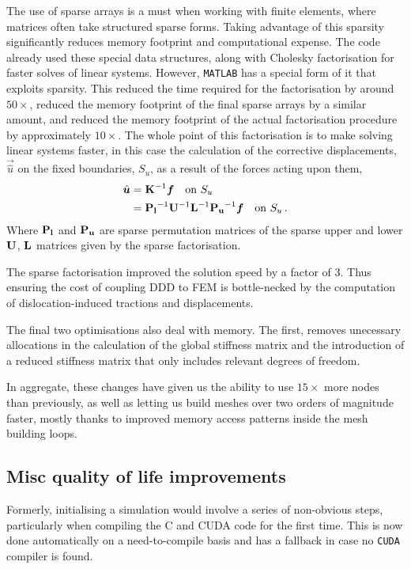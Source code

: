 The use of sparse arrays is a must when working with finite elements, where matrices often take structured sparse forms. Taking advantage of this sparsity significantly reduces memory footprint and computational expense. The code already used these special data structures, along with Cholesky factorisation for faster solves of linear systems. However, \texttt{MATLAB} has a special form of it that exploits sparsity. This reduced the time required for the factorisation by around $50\times$, reduced the memory footprint of the final sparse arrays by a similar amount, and reduced the memory footprint of the actual factorisation procedure by approximately $10 \times$. The whole point of this factorisation is to make solving linear systems faster, in this case the calculation of the corrective displacements, $\vec{\hat{u}}$ on the fixed boundaries, $S_u$, as a result of the forces acting upon them,
\begin{align}
    \vec{\hat{u}} & = \mtx{K}^{-1} \vec{f}\quad \text{on } S_u                                               \\
                  & = \mtx{P_l}^{-1} \mtx{U}^{-1} \mtx{L}^{-1} \mtx{P_u}^{-1} \vec{f}\quad \text{on } S_u\,.
\end{align}
Where $\mathbf{P_l}$ and $\mathbf{P_u}$ are sparse permutation matrices of the sparse upper and lower $\mathbf{U}$, $\mathbf{L}$ matrices given by the sparse factorisation.

The sparse factorisation improved the solution speed by a factor of 3. Thus ensuring the cost of coupling DDD to FEM is bottle-necked by the computation of dislocation-induced tractions and displacements.

The final two optimisations also deal with memory. The first, removes unecessary allocations in the calculation of the global stiffness matrix and the introduction of a reduced stiffness matrix that only includes relevant degrees of freedom.

In aggregate, these changes have given us the ability to use $15 \times$ more nodes than previously, as well as letting us build meshes over two orders of magnitude faster, mostly thanks to improved memory access patterns inside the mesh building loops.

\subsection{Misc quality of life improvements}\label{s:qol}

Formerly, initialising a simulation would involve a series of non-obvious steps, particularly when compiling the C and CUDA code for the first time. This is now done automatically on a need-to-compile basis and has a fallback in case no \texttt{CUDA} compiler is found.

